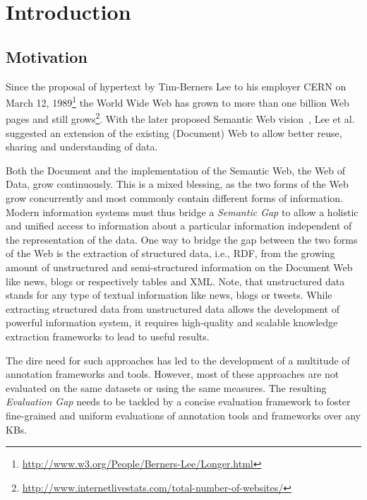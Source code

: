 \chapter{Introduction}

\section*{Motivation}

Since the proposal of hypertext by Tim-Berners Lee to his employer CERN on March 12, 1989\footnote{\url{http://www.w3.org/People/Berners-Lee/Longer.html}} the World Wide Web has grown to more than one billion Web pages and still grows\footnote{\url{http://www.internetlivestats.com/total-number-of-websites/}}.
With the later proposed Semantic Web vision~\cite{bernerslee2001semantic}, Lee et al. suggested an extension of the existing (Document) Web to allow better reuse, sharing and understanding of data.

Both the Document and the implementation of the Semantic Web, the Web of Data, grow continuously. 
This is a mixed blessing, as the two forms of the Web grow concurrently and most commonly contain different forms of information. 
Modern information systems must thus bridge a \emph{Semantic Gap} to allow a holistic and unified access to information about a particular information independent of the representation of the data.
One way to bridge the gap between the two forms of the Web is the extraction of structured data, i.e., \ac{RDF}, from the growing amount of unstructured and semi-structured information on the Document Web like news, blogs or respectively tables and XML.
Note, that unstructured data stands for any type of textual information like news, blogs or tweets. 
While extracting structured data from unstructured data allows the development of powerful information system, it requires high-quality and scalable knowledge extraction frameworks to lead to useful results. 

The dire need for such approaches has led to the development of a multitude of annotation frameworks and tools. 
However, most of these approaches are not evaluated on the same datasets or using the same measures.
The resulting \emph{Evaluation Gap} needs to be tackled by a concise evaluation framework to foster fine-grained and uniform evaluations of annotation tools and frameworks over any \ac{KB}s.

